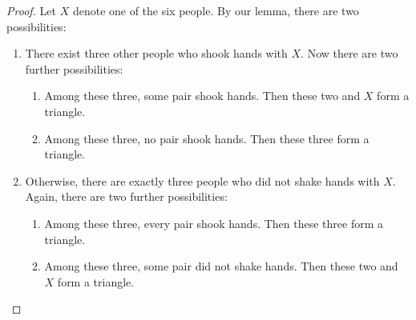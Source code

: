 \documentclass[twoside,12pt]{article}
\begin{document}
{\begin{proof}
Let $X$ denote one of the six people. By our lemma, there
are two possibilities:
%
\begin{enumerate}
\item There exist three other people who shook hands with $X$.  Now
there are two further possibilities:
%
\begin{enumerate}
\item Among these three, some pair shook hands.  Then these two and
$X$ form a triangle.
\item Among these three, no pair shook hands.  Then these three form a
triangle.
\end{enumerate}
%
\item Otherwise, there are exactly three people who did not shake hands with $X$.
Again, there are two further possibilities:
%
\begin{enumerate}
\item Among these three, every pair shook hands.  Then these three
form a triangle.
\item Among these three, some pair did not shake hands.  Then these two
and $X$ form a triangle.
\end{enumerate}
\end{enumerate}
\end{proof}
}

\end{document}
